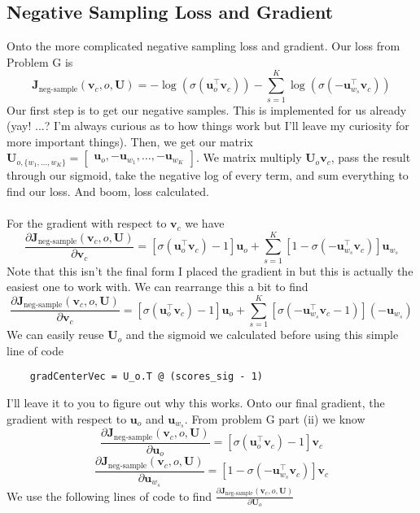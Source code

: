 \documentclass[12pt]{article}
\begin{document}
\subsection{Negative Sampling Loss and Gradient}
Onto the more complicated negative sampling loss and gradient. Our loss from Problem G is
\begin{equation*}
    \bm J_{\text{neg-sample}}(\bm v_c, o, \bm U) = -\log(\sigma(\bm u_o^\top \bm v_c)) - \sum_{s=1}^K \log(\sigma(-\bm u_{w_s}^\top \bm v_c))
\end{equation*}
Our first step is to get our negative samples. This is implemented for us already (yay! ...? 
I'm always curious as to how things work but I'll leave my curiosity for more important things). 
Then, we get our matrix 
$\bm{U}_{o, \{w_1, \dots, w_K\}} = \begin{bmatrix} \bm{u}_o, -\bm{u}_{w_1}, \dots, -\bm{u}_{w_K} \end{bmatrix}$. 
We matrix multiply $\bm U_o \bm v_c$, pass the result through our sigmoid, take the negative log 
of every term, and sum everything to find our loss. And boom, loss calculated. 
~\\
~\\
For the gradient with respect to $\bm v_c$ we have 
\begin{equation*}
    \frac{\partial \bm J_{\text{neg-sample}}(\bm v_c, o, \bm U)}{\partial \bm v_c} = 
    [\sigma(\bm u_o^\top \bm v_c) - 1] \bm u_o +
    \sum_{s=1}^K [1 - \sigma(-\bm u_{w_s}^\top \bm v_c)]
    \bm u_{w_s}
\end{equation*}
Note that this isn't the final form I placed the gradient in but this is actually the 
easiest one to work with. We can rearrange this a bit to find 
\begin{equation*}
    \frac{\partial \bm J_{\text{neg-sample}}(\bm v_c, o, \bm U)}{\partial \bm v_c} = 
    [\sigma(\bm u_o^\top \bm v_c) - 1] \bm u_o +
    \sum_{s=1}^K [\sigma(-\bm u_{w_s}^\top \bm v_c - 1)]
    (- \bm u_{w_s})
\end{equation*}
We can easily reuse $\bm U_o$ and the sigmoid we calculated before using this simple line of code 
\begin{verbatim}
    gradCenterVec = U_o.T @ (scores_sig - 1) 
\end{verbatim}
I'll leave it to you to figure out why this works. 
Onto our final gradient, the gradient with respect to $\bm u_o$ and $\bm u_{w_s}$. 
From problem G part (ii) we know 
\begin{equation*}
    \frac{\partial \bm J_{\text{neg-sample}}(\bm v_c, o, \bm U)}{\partial \bm u_o} = 
    [\sigma(\bm u_o^\top \bm v_c) - 1] \bm v_c
\end{equation*}
\begin{equation*}
    \frac{\partial \bm J_{\text{neg-sample}}(\bm v_c, o, \bm U)}{\partial \bm u_{w_s}} = 
    [1 - \sigma(-\bm u_{w_s}^\top \bm v_c)]
    \bm v_c
\end{equation*}
We use the following lines of code to find 
$\frac{\partial \bm J_{\text{neg-sample}}(\bm v_c, o, \bm U)}{\partial \bm U_o}$
\end{document}
